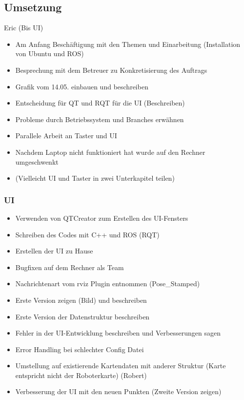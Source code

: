 \documentclass[a4paper,12pt,headsepline,toc=flat]{scrartcl}
\begin{document}
	\subsection{Umsetzung}
		Eric (Bis UI)\\
		\begin{itemize}
			\item Am Anfang Beschäftigung mit den Themen und Einarbeitung (Installation von Ubuntu und ROS)
			\item Besprechung mit dem Betreuer zu Konkretisierung des Auftrags
			\item Grafik vom 14.05. einbauen und beschreiben 
			\item Entscheidung für QT und RQT für die UI (Beschreiben)
			\item Probleme durch Betriebssystem und Branches erwähnen
			\item Parallele Arbeit an Taster und UI
			\item Nachdem Laptop nicht funktioniert hat wurde auf den Rechner umgeschwenkt
			\item (Vielleicht UI und Taster in zwei Unterkapitel teilen)
		\end{itemize}
			\subsubsection{UI}
			\begin{itemize}
				\item Verwenden von QTCreator zum Erstellen des UI-Fensters
				\item Schreiben des Codes mit C++ und ROS (RQT)
				\item Erstellen der UI zu Hause
				\item Bugfixen auf dem Rechner als Team
				\item Nachrichtenart vom rviz Plugin entnommen (Pose{\_}Stamped)
				\item Erste Version zeigen (Bild) und beschreiben
				\item Erste Version der Datenstruktur beschreiben
				\item Fehler in der UI-Entwicklung beschreiben und Verbesserungen sagen
				\item Error Handling bei schlechter Config Datei
				\item Umstellung auf existierende Kartendaten mit anderer Struktur (Karte entspricht nicht der Roboterkarte) (Robert)
				\item Verbesserung der UI mit den neuen Punkten (Zweite Version zeigen)
			\end{itemize}
			
\end{document}

